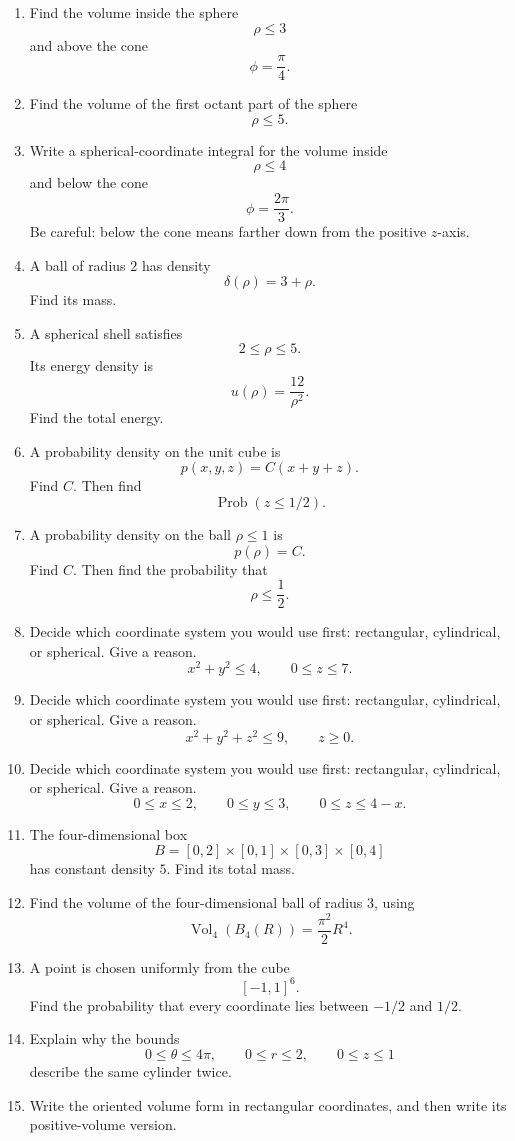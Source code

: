 \begin{enumerate}
\item Find the volume inside the sphere
\[
    \rho\le3
\]
and above the cone
\[
    \phi=\frac{\pi}{4}.
\]

\item Find the volume of the first octant part of the sphere
\[
    \rho\le5.
\]

\item Write a spherical-coordinate integral for the volume inside
\[
    \rho\le4
\]
and below the cone
\[
    \phi=\frac{2\pi}{3}.
\]
Be careful: below the cone means farther down from the positive \(z\)-axis.

\item A ball of radius \(2\) has density
\[
    \delta(\rho)=3+\rho.
\]
Find its mass.

\item A spherical shell satisfies
\[
    2\le\rho\le5.
\]
Its energy density is
\[
    u(\rho)=\frac{12}{\rho^2}.
\]
Find the total energy.

\item A probability density on the unit cube is
\[
    p(x,y,z)=C(x+y+z).
\]
Find \(C\).  Then find
\[
    \operatorname{Prob}(z\le1/2).
\]

\item A probability density on the ball \(\rho\le1\) is
\[
    p(\rho)=C.
\]
Find \(C\).  Then find the probability that
\[
    \rho\le\frac12.
\]

\item Decide which coordinate system you would use first: rectangular, cylindrical, or
spherical.  Give a reason.
\[
    x^2+y^2\le4,\qquad 0\le z\le 7.
\]

\item Decide which coordinate system you would use first: rectangular, cylindrical, or
spherical.  Give a reason.
\[
    x^2+y^2+z^2\le9,\qquad z\ge0.
\]

\item Decide which coordinate system you would use first: rectangular, cylindrical, or
spherical.  Give a reason.
\[
    0\le x\le2,\qquad 0\le y\le3,\qquad 0\le z\le 4-x.
\]

\item The four-dimensional box
\[
    B=[0,2]\times[0,1]\times[0,3]\times[0,4]
\]
has constant density \(5\).  Find its total mass.

\item Find the volume of the four-dimensional ball of radius \(3\), using
\[
    \operatorname{Vol}_4(B_4(R))=\frac{\pi^2}{2}R^4.
\]

\item A point is chosen uniformly from the cube
\[
    [-1,1]^6.
\]
Find the probability that every coordinate lies between \(-1/2\) and \(1/2\).

\item Explain why the bounds
\[
    0\le\theta\le4\pi,\qquad 0\le r\le2,\qquad 0\le z\le1
\]
describe the same cylinder twice.

\item Write the oriented volume form in rectangular coordinates, and then write its
positive-volume version.
\end{enumerate}

